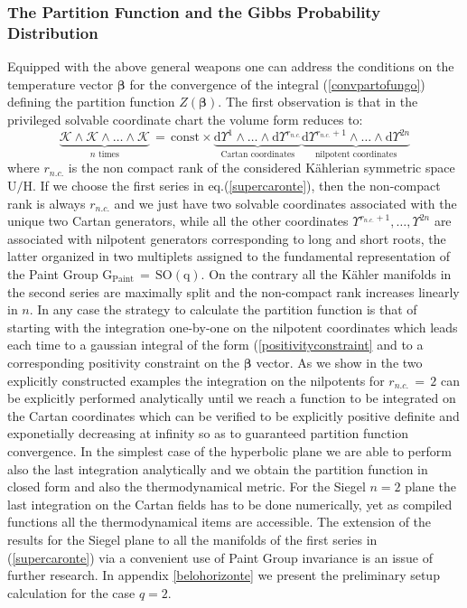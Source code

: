 \documentclass[10pt,a4paper]{article}
\begin{document}
\subsubsection{The Partition Function and the Gibbs Probability Distribution}
Equipped with the above general weapons one can address the conditions on the temperature vector $\boldsymbol{\beta}$ for the convergence of the integral (\ref{convpartofungo}) defining the partition function
$Z(\boldsymbol{\beta})$. The first observation is that in the privileged solvable coordinate chart the volume form reduces to:
\begin{equation}\label{garibaldino}
  \underbrace{\boldsymbol{\mathcal{K}}\wedge\boldsymbol{\mathcal{K}} \wedge \dots \wedge \boldsymbol{\mathcal{K}}}_{n \text{ times}}  \, = \, \text{const} \times \underbrace{\mathrm{d}\Upsilon^1 \wedge\dots\wedge \mathrm{d}\Upsilon^{r_{n.c.}}}_{\text{Cartan coordinates}} \underbrace{\mathrm{d}\Upsilon^{r_{n.c.}+1}\wedge\dots \wedge \mathrm{d}\Upsilon^{2n}}_{\text{nilpotent coordinates}}
\end{equation}
where $r_{n.c.}$ is the non compact rank of the considered K\"ahlerian symmetric space $\mathrm{U/H}$. If we choose the first series in eq.(\ref{supercaronte}), then the non-compact rank is always $r_{n.c.}$ and we just have two solvable coordinates associated with the unique two Cartan generators, while all the other coordinates $\Upsilon^{r_{n.c.}+1},\dots,\Upsilon^{2n}$ are associated with nilpotent generators corresponding to long and short roots, the latter organized in two multiplets assigned to the fundamental representation of the Paint Group $\mathrm{G_{Paint}} \, = \, \mathrm{SO(q)}$.  On the contrary all the K\"ahler manifolds in the second series
are maximally split and the non-compact rank increases linearly in $n$. In any case the strategy to calculate the partition function is that of starting with the integration one-by-one on the nilpotent coordinates  which leads each time to a gaussian integral  of the form (\ref{positivityconstraint} and to a corresponding positivity constraint on the $\boldsymbol{\beta}$ vector. As we show in the two explicitly constructed examples the integration on the nilpotents for $r_{n.c.}\, = \,2$ can be explicitly performed analytically until we reach a function to be integrated on the Cartan coordinates which can be verified to be explicitly positive definite and exponetially decreasing at infinity so as to guaranteed partition function convergence. In the simplest case of the hyperbolic plane we are able to perform also the last integration analytically and we obtain the partition function in closed form and also the thermodynamical metric. For the Siegel $n=2$ plane the last integration on the Cartan fields has to be done numerically, yet as compiled functions all the thermodynamical items are accessible. The extension of the
results for the Siegel plane to all the manifolds of the first series in (\ref{supercaronte}) via a convenient use of Paint Group invariance is an issue of further research. In appendix \ref{belohorizonte} we present the preliminary setup calculation for the case $q=2$.
\end{document}

